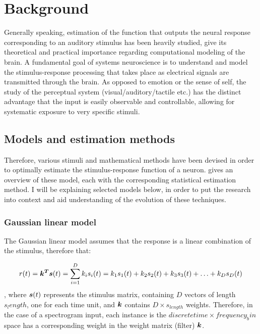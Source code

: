 \chapter{Background}\label{background}

Generally speaking, estimation of the function that outputs the neural response corresponding to an auditory stimulus has been heavily studied, give its theoretical and practical importance regarding computational modeling of the brain. A fundamental goal of systems neuroscience is to understand and model the stimulus-response processing that takes place as electrical signals are transmitted through the brain. As opposed to emotion or the sense of self, the study of the perceptual system (visual/auditory/tactile etc.) has the distinct advantage that the input is easily observable and controllable, allowing for systematic exposure to very specific stimuli. 

\section{Models and estimation methods}

Therefore, various stimuli and mathematical methods have been devised in order to optimally estimate the stimulus-response function of a neuron. \textcite{meyerModelsNeuronalStimulusResponse2017} gives an overview of these model, each with the corresponding statistical estimation method. I will be explaining selected models below, in order to put the research into context and aid understanding of the evolution of these techniques.

\subsection{Gaussian linear model}

The Gaussian linear model assumes that the response is a linear combination of the stimulus, therefore that:

\begin{equation} \label{LM}
r(t) = \bm{k^{T}}\bm{s}(t) = \sum_{i=1}^D k_i s_i(t) = k_1 s_1(t) + k_2 s_2(t) + k_3 s_3(t) + \ldots + k_D s_D(t)
\end{equation}
, where $\bm{s}(t)$ represents the stimulus matrix, containing $D$ vectors of length $s_length$, one for each time unit, and $\bm{k}$ contains $D \times s_{length}$ weights. Therefore, in the case of a spectrogram input, each instance is the $discrete time \times frequency_bin$ space has a corresponding weight in the weight matrix (filter) $\bm{k}$.


